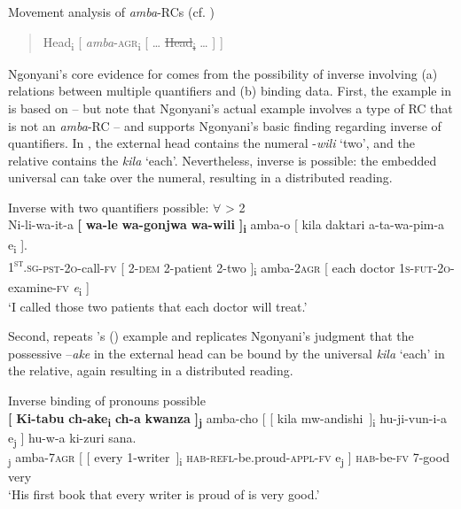 \documentclass[output=paper,modfonts,nonflat,
colorlinks, citecolor=brown,
]{langsci/langscibook}
\begin{document}
\ea\label{ex:gould:5}Movement analysis of \textit{amba}{}-RCs (cf. \citealt{Ngonyani2006})\\
\begin{quote}
Head\textsubscript{i} [ \textit{amba}{}-\textsc{agr}\textsubscript{i} [ … \sout{Head\textsubscript{i}} … ] ]
\end{quote}
\z

Ngonyani’s core evidence for  comes from the possibility of inverse  involving (a)  relations between multiple quantifiers and (b) binding data. First, the example in  is based on \citet[66]{Ngonyani2001} – but note that Ngonyani’s actual example involves a type of RC that is not an \textit{amba}{}-RC – and supports Ngonyani’s basic finding regarding inverse  of quantifiers. In , the external head contains the numeral -\textit{wili} ‘two’, and the relative contains the  \textit{kila} ‘each’. Nevertheless, inverse  is possible: the embedded universal can take  over the numeral, resulting in a distributed reading.

\ea\label{ex:gould:6}Inverse  with two quantifiers possible:  $\forall$ > 2\\
\gll Ni-li-wa-it-a \textbf{[} \textbf{wa-le} \textbf{wa-gonjwa} \textbf{wa-wili} \textbf{]\textsubscript{i}} amba-o [ kila daktari a-ta-wa-pim-a e\textsubscript{i} ].\\
\textsc{1\textsuperscript{st}.sg}\textsc{{}-pst-2o}{}-call-\textsc{fv} [ \textsc{2-dem} 2-patient 2-two ]\textsubscript{i} amba{}-2\textsc{agr} [ each doctor \textsc{1s-fut-2o}{}-examine-\textsc{fv} \textit{e}\textsubscript{i} ]\\
\glt ‘I called those two patients that each doctor will treat.’
\z

Second,  repeats \citeauthor{Ngonyani2001}'s ({\citeyear[65]{Ngonyani2001}}) example and replicates Ngonyani’s judgment that the possessive  –\textit{ake} in the external head can be bound by the universal \textit{kila} ‘each’ in the relative, again resulting in a distributed reading. 

\ea\label{ex:gould:7}Inverse binding of pronouns possible\\
\gll \textbf{[} \textbf{Ki-tabu} \textbf{ch-ake\textsubscript{i}} \textbf{ch-a} \textbf{kwanza} \textbf{]\textsubscript{j}} amba-cho [ [ kila mw-andishi~]\textsubscript{i}\hspace*{-3mm} hu-ji-vun-i-a e\textsubscript{j} ] hu-w-a ki-zuri sana.\\
[ 7-book 7-\textsc{3\textsuperscript{rd}.sg.poss}\textsubscript{i} 7-of first ]\textsubscript{j} amba-\textsc{7agr} [ [ every 1-writer~]\textsubscript{i} \textsc{hab}{}-\textsc{refl}{}-be.proud-\textsc{appl}{}-\textsc{fv} e\textsubscript{j} ] \textsc{hab}{}-be-\textsc{fv} 7-good very\\
\glt ‘His first book that every writer is proud of is very good.’
\z
\end{document}
